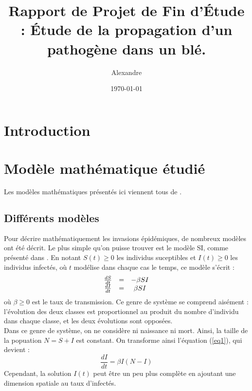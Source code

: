 \documentclass{article}
\title{Rapport de Projet de Fin d'Étude : Étude de la propagation d'un pathogène dans un blé.}
\author{Alexandre \bsc{Vieira}}
\date{\today}
\begin{document}
\maketitle
\tableofcontents

\newpage

\section*{Introduction}

\section{Modèle mathématique étudié}
Les modèles mathématiques présentés ici viennent tous de \cite{KotMedlock03}. 
\subsection{Différents modèles}
Pour décrire mathématiquement les invasions épidémiques, de nombreux modèles ont été décrit. Le plus simple qu'on puisse trouver est le modèle SI, comme présenté dans \cite{daley2001epidemic}. En notant $S(t)\geq 0$ les individus suceptibles et $I(t)\geq 0$ les individus infectés, où $t$ modélise dans chaque cas le temps, ce modèle s'écrit :
\begin{equation} \label{eq1}
\begin{array}{c c c}
	\frac{dS}{dt}&=&-\beta SI\\
	\frac{dI}{dt}&=&\beta SI
\end{array}
\end{equation}
où $\beta\geq 0$ est le taux de transmission. Ce genre de système se comprend aisément : l'évolution des deux classes est proportionnel au produit du nombre d'individu dans chaque classe, et les deux évolutions sont opposées.\\
Dans ce genre de système, on ne considère ni naissance ni mort. Ainsi, la taille de la popuation $N=S+I$ est constant. On transforme ainsi l'équation (\ref{eq1}), qui devient :
\begin{equation}\label{eqSI}
	\frac{dI}{dt}=\beta I(N-I)
\end{equation}
Cependant, la solution $I(t)$ peut être un peu plus complète en ajoutant une dimension spatiale au taux d'infectés.
\end{document}
